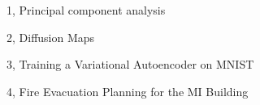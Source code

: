 \documentclass[10pt,a4paper]{article}
\begin{document}
\frontpage

\begin{task}{1, Principal component analysis}

\end{task}

\begin{task}{2, Diffusion Maps}

\end{task}

\begin{task}{3, Training a Variational Autoencoder on MNIST}

\end{task}

\begin{task}{4, Fire Evacuation Planning for the MI Building}

\end{task}



\end{document}
